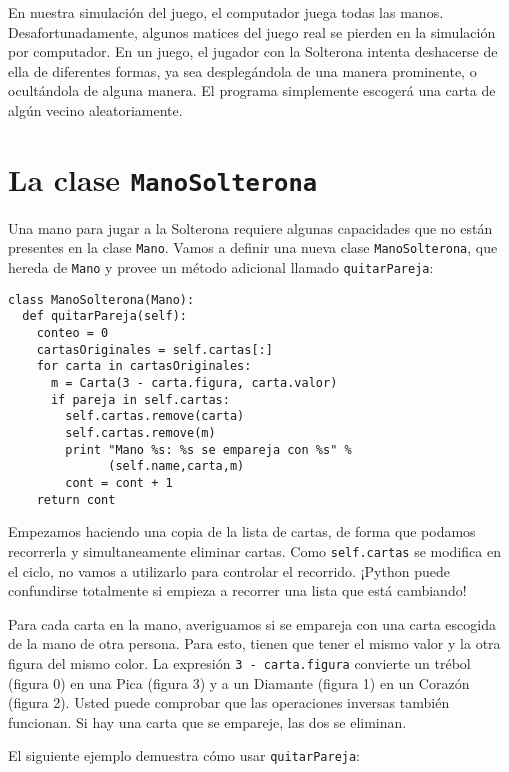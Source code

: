 En nuestra simulación del juego, el computador juega todas las manos. 
Desafortunadamente, algunos matices del juego real se pierden en la
simulación por computador. En un juego, el jugador con la Solterona
intenta deshacerse de ella de diferentes formas, ya sea desplegándola
de una manera prominente, o ocultándola de alguna manera. El programa 
simplemente escogerá una carta de algún vecino aleatoriamente.



\section {La clase \texttt{ManoSolterona}}

Una mano para jugar a la Solterona requiere algunas capacidades que no
están presentes en la clase \texttt{Mano}.  Vamos a definir una nueva
clase  {\tt ManoSolterona}, que hereda de \texttt{Mano} y provee un 
método adicional llamado \texttt{quitarPareja}:


\beforeverb
\begin{verbatim}
class ManoSolterona(Mano):
  def quitarPareja(self):
    conteo = 0
    cartasOriginales = self.cartas[:]
    for carta in cartasOriginales:
      m = Carta(3 - carta.figura, carta.valor)
      if pareja in self.cartas:
        self.cartas.remove(carta)
        self.cartas.remove(m)
        print "Mano %s: %s se empareja con %s" % 
              (self.name,carta,m)
        cont = cont + 1
    return cont
\end{verbatim}
\afterverb
%
Empezamos haciendo una copia de la lista de cartas, de forma que 
podamos recorrerla y simultaneamente eliminar cartas. Como 
\texttt{self.cartas} se modifica en el ciclo, no vamos a 
utilizarlo para controlar el recorrido. ¡Python puede confundirse
totalmente si empieza a recorrer una lista que está cambiando!




Para cada carta en la mano, averiguamos si se empareja con una carta escogida de la
mano de otra persona. Para esto, tienen que tener el mismo valor y la otra figura 
del mismo color.  La expresión \texttt{3 - carta.figura}
convierte un trébol (figura 0) en una Pica (figura 3) y a un Diamante
(figura 1) en un Corazón (figura 2). Usted puede comprobar que las 
operaciones inversas también funcionan. Si hay una carta que 
se empareje, las dos se eliminan.

El siguiente ejemplo demuestra cómo usar \texttt{quitarPareja}:

